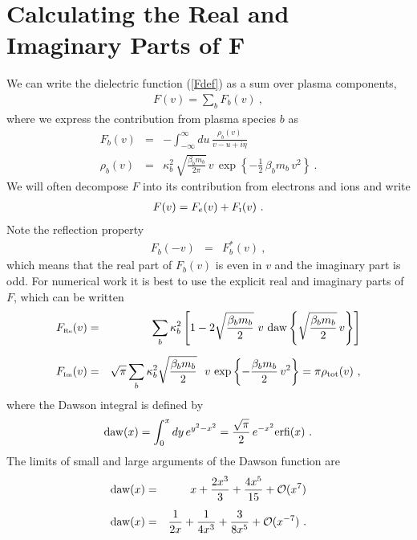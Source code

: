 \documentclass[preprint,12pt,eqsecnum,nofootinbib,amsmath,amssymb]{revtex4}
\newcommand{\smI}{{\rm\scriptscriptstyle I}}
\newcommand{\smRe}{{\rm\scriptscriptstyle Re}}
\newcommand{\smIm}{{\rm\scriptscriptstyle Im}}
\begin{document}
{{{{{{{\pagebreak
\appendix



\section{Calculating the Real and Imaginary Parts of F}
\label{app:FrFi}

We can write the dielectric function (\ref{Fdef}) as a sum over plasma
components,
\begin{eqnarray}
  F(v)={\sum}_b F_b(v) \ ,
\end{eqnarray}
where we express the contribution from plasma species $b$ as
\begin{eqnarray}
  F_b(v) 
  &=& 
\label{Fbdef}
  -\int_{-\infty}^\infty du\, \frac{\rho_b(v)}{v - u + i\eta}
\\[5pt]
  \rho_b(v) 
  &=& 
  \kappa_b^2\,\sqrt{\frac{\beta_b m_b}{2\pi}}\, v\,
  \exp\!\left\{-\frac{1}{2}\,\beta_b m_b\, v^2\right\} \ .
\label{barrhob}
\end{eqnarray} 
We will often decompose $F$ into its contribution from
electrons and ions and write
\begin{eqnarray}
 F(v)=F_e(v) + F_\smI(v) \ .
\end{eqnarray}
Note the reflection property
\begin{eqnarray}
  F_b(-v) 
  &=& 
  F_b^*(v) \ ,
\label{Fbreflect}
\end{eqnarray}
which means that the real part of $F_b(v)$ is even in $v$ and the
imaginary part is odd. For numerical work it is best to use the
explicit real and imaginary parts of $F$, which can be written
\begin{eqnarray}
  F_\smRe(v)
  &=& 
  \sum_b \kappa_b^2 
  \left[1 - 2 \sqrt{\frac{\beta_b m_b}{2}} ~v~
  {\rm daw}\left\{\sqrt{\frac{\beta_b m_b}{2}}\,v 
  \right\} \right]
\label{Fru}
\\[5pt]
  F_\smIm(v)
  &=&
  \sqrt{\pi} \sum_b \kappa_b^2 
  \sqrt{\frac{\beta_b m_b}{2}}~~
  v\, \exp\left\{-\frac{\beta_b m_b}
  {2}\, v^2\right\} = \pi  \rho_{\rm tot}(v)  \ ,
\label{Fiu}
\end{eqnarray}
where the Dawson integral is defined by 
  \begin{eqnarray}
  {\rm daw}(x) = \int_0^x dy\, 
  e^{y^2 - x^2} = \frac{\sqrt{\pi}}{2}\, e^{-x^2}
  {\rm erfi}(x) \ .
  \end{eqnarray}
The limits of small and large arguments of the Dawson function
are
\begin{eqnarray}
  {\rm daw}(x) 
  &=& 
  x +\frac{2 x^3}{3} + \frac{4 x^5}{15} + {\cal O}(x^7) 
\label{dawA}
\\[5pt]
  {\rm daw}(x)
  &=&
  \frac{1}{2x} +\frac{1}{4 x^3} + \frac{3}{8x^5} + {\cal O}(x^{-7}) \ .
\label{dawB}
\end{eqnarray}

}}}}}}}
\end{document}
